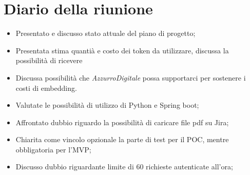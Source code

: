 

\section{Diario della riunione}

\begin{itemize}
    \item Presentato e discusso stato attuale del piano di progetto;
    \item Presentata stima quantià e costo dei token da utilizzare, discussa la possibilità di ricevere 
    \item Discussa possibilità che \emph{AzzurroDigitale} possa supportarci per sostenere i costi di embedding.
    \item Valutate le possibilità di utilizzo di Python e Spring boot;
    \item Affrontato dubbio riguardo la possibilità di caricare file pdf su Jira;
    \item Chiarita come vincolo opzionale la parte di test per il POC, mentre obbligatoria per l'MVP;
    \item Discusso dubbio riguardante limite di 60 richieste autenticate all'ora;
\end{itemize}
